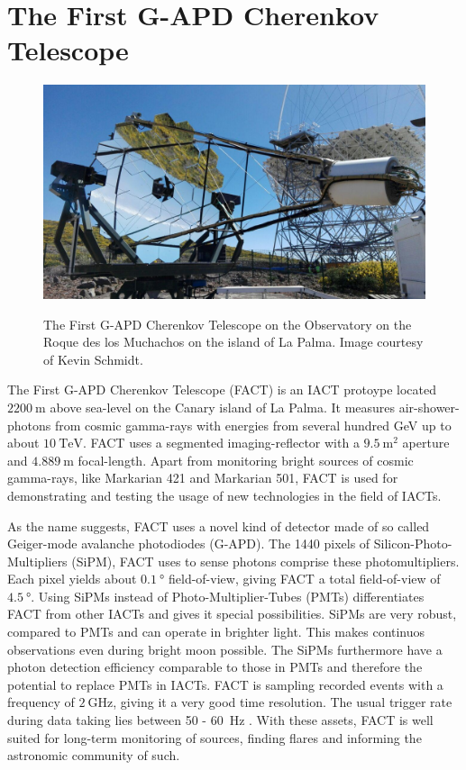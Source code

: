 \chapter{The First G-APD Cherenkov Telescope}\label{ch:fact}
%
\begin{figure}
  \centering
  \includegraphics[width=\textwidth]{Plots/fact.jpg}
  \label{fig:fact}
  \caption{The First G-APD Cherenkov Telescope on the Observatory on the Roque des los Muchachos on the island of La Palma. Image courtesy of Kevin Schmidt.}
\end{figure}
%
The First G-APD Cherenkov Telescope \cite{FACT-Design} (FACT) is an IACT
protoype located $\SI{2200}{\metre}$ above sea-level on the Canary island of La
Palma. It measures air-shower-photons from cosmic gamma-rays with energies from
several hundred GeV up to about $\SI{10}{\tera\electronvolt}$. FACT uses a
segmented imaging-reflector with a $\SI{9.5}{\meter\squared}$ aperture and
$\SI{4.889}{\meter}$ focal-length. Apart from monitoring bright sources of
cosmic gamma-rays, like Markarian 421 and Markarian 501, FACT is used for
demonstrating and testing the usage of new technologies in the field of IACTs.

As the name suggests, FACT uses a novel kind of detector made of so called
Geiger-mode avalanche photodiodes (G-APD). The 1440 pixels of Silicon-Photo-
Multipliers (SiPM), FACT uses to sense photons comprise these photomultipliers.
Each pixel yields about $\SI{0.1}{\degree}$ field-of-view, giving FACT
a total field-of-view of $\SI{4.5}{\degree}$. Using SiPMs instead of
Photo-Multiplier-Tubes (PMTs) differentiates FACT from other IACTs and gives it
special possibilities. SiPMs are very robust, compared to PMTs and can operate
in brighter light. This makes continuos observations even during bright moon
possible. The SiPMs furthermore have a photon detection efficiency comparable to those in PMTs and therefore the potential to replace PMTs in IACTs. FACT is sampling recorded
events with a frequency of $\SI{2}{\giga\hertz}$, giving it a very good time
resolution. The usual trigger rate during data taking lies between \num{50} - \SI{60}{\hertz} \cite{FACT-Design}. With these assets, FACT is well suited for long-term monitoring of
sources, finding flares and informing the astronomic community of such.
